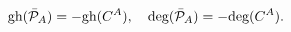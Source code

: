 \begin{equation}
\hbox{gh}(\bar{\cal P}_{A})=-\hbox{gh}(C^{A}),\quad
\hbox{deg}(\bar{\cal P}_{A})=-\hbox{deg}(C^{A}).\label{3.32b}
\end{equation}

